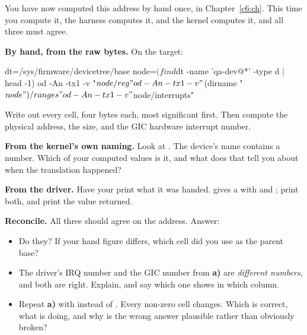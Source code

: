 You have now computed this address by hand once, in Chapter~\ref{c6:ch}. This time you compute it,
the harness computes it, and the kernel computes it, and all three must agree.

 \textbf{By hand, from the raw bytes.} On the target:

\begin{shell}
dt=/sys/firmware/devicetree/base
node=$(find $dt -name 'qa-dev@*' -type d | head -1)
od -An -tx1 -v "$node/reg"
od -An -tx1 -v "$(dirname "$node")/ranges"
od -An -tx1 -v "$node/interrupts"
\end{shell}

\noindent Write out every cell, four bytes each, most significant first. Then compute the physical
address, the size, and the GIC hardware interrupt number.

 \textbf{From the kernel's own naming.} Look at . The device's name contains a number. Which of your computed values is it, and what does
that tell you about when the translation happened?

 \textbf{From the driver.} Have your  print what it was handed.
 gives a  with
 and ; print both, and print the value  returned.

 \textbf{Reconcile.} All three should agree on the address. Answer:
\begin{itemize}
  \item Do they? If your hand figure differs, which  cell did you use as the parent
    base?
  \item The driver's IRQ number and the GIC number from \textbf{a)} are \emph{different numbers},
    and both are right. Explain, and say which one  shows in which column.
  \item Repeat \textbf{a)} with  instead of . Every non-zero cell
    changes. Which is correct, what is  doing, and why is the wrong answer plausible
    rather than obviously broken?
\end{itemize}

